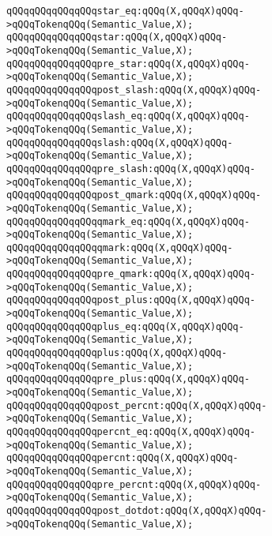 \verb|qQQqqQQqqQQqqQQqstar_eq:qQQq(X,qQQqX)qQQq->qQQqTokenqQQq(Semantic_Value,X);|\newline
\verb|qQQqqQQqqQQqqQQqstar:qQQq(X,qQQqX)qQQq->qQQqTokenqQQq(Semantic_Value,X);|\newline
\verb|qQQqqQQqqQQqqQQqpre_star:qQQq(X,qQQqX)qQQq->qQQqTokenqQQq(Semantic_Value,X);|\newline
\verb|qQQqqQQqqQQqqQQqpost_slash:qQQq(X,qQQqX)qQQq->qQQqTokenqQQq(Semantic_Value,X);|\newline
\verb|qQQqqQQqqQQqqQQqslash_eq:qQQq(X,qQQqX)qQQq->qQQqTokenqQQq(Semantic_Value,X);|\newline
\verb|qQQqqQQqqQQqqQQqslash:qQQq(X,qQQqX)qQQq->qQQqTokenqQQq(Semantic_Value,X);|\newline
\verb|qQQqqQQqqQQqqQQqpre_slash:qQQq(X,qQQqX)qQQq->qQQqTokenqQQq(Semantic_Value,X);|\newline
\verb|qQQqqQQqqQQqqQQqpost_qmark:qQQq(X,qQQqX)qQQq->qQQqTokenqQQq(Semantic_Value,X);|\newline
\verb|qQQqqQQqqQQqqQQqqmark_eq:qQQq(X,qQQqX)qQQq->qQQqTokenqQQq(Semantic_Value,X);|\newline
\verb|qQQqqQQqqQQqqQQqqmark:qQQq(X,qQQqX)qQQq->qQQqTokenqQQq(Semantic_Value,X);|\newline
\verb|qQQqqQQqqQQqqQQqpre_qmark:qQQq(X,qQQqX)qQQq->qQQqTokenqQQq(Semantic_Value,X);|\newline
\verb|qQQqqQQqqQQqqQQqpost_plus:qQQq(X,qQQqX)qQQq->qQQqTokenqQQq(Semantic_Value,X);|\newline
\verb|qQQqqQQqqQQqqQQqplus_eq:qQQq(X,qQQqX)qQQq->qQQqTokenqQQq(Semantic_Value,X);|\newline
\verb|qQQqqQQqqQQqqQQqplus:qQQq(X,qQQqX)qQQq->qQQqTokenqQQq(Semantic_Value,X);|\newline
\verb|qQQqqQQqqQQqqQQqpre_plus:qQQq(X,qQQqX)qQQq->qQQqTokenqQQq(Semantic_Value,X);|\newline
\verb|qQQqqQQqqQQqqQQqpost_percnt:qQQq(X,qQQqX)qQQq->qQQqTokenqQQq(Semantic_Value,X);|\newline
\verb|qQQqqQQqqQQqqQQqpercnt_eq:qQQq(X,qQQqX)qQQq->qQQqTokenqQQq(Semantic_Value,X);|\newline
\verb|qQQqqQQqqQQqqQQqpercnt:qQQq(X,qQQqX)qQQq->qQQqTokenqQQq(Semantic_Value,X);|\newline
\verb|qQQqqQQqqQQqqQQqpre_percnt:qQQq(X,qQQqX)qQQq->qQQqTokenqQQq(Semantic_Value,X);|\newline
\verb|qQQqqQQqqQQqqQQqpost_dotdot:qQQq(X,qQQqX)qQQq->qQQqTokenqQQq(Semantic_Value,X);|\newline

